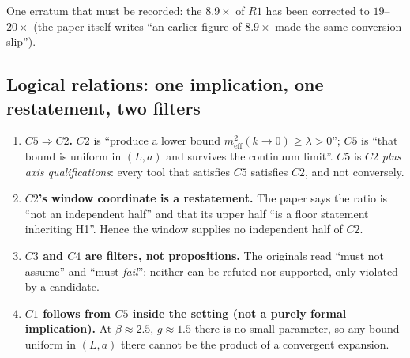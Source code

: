 
\noindent
One erratum that must be recorded: the $8.9\times$ of $R1$ has been corrected to $19$--$20\times$
(the paper itself writes ``an earlier figure of $8.9\times$ made the same conversion slip''). \LT
{}

\subsection{Logical relations: one implication, one restatement, two filters}

\begin{enumerate}[label=(\arabic*)]
\item \textbf{$C5\Rightarrow C2$.} $C2$ is ``produce a lower bound
      $m_{\mathrm{eff}}^{2}(k\to0)\ge\lambda>0$''; $C5$ is ``that bound is uniform in $(L,a)$ and
      survives the continuum limit''. $C5$ is $C2$ \emph{plus axis qualifications}: every tool that
      satisfies $C5$ satisfies $C2$, and not conversely. \LC
\item \textbf{$C2$'s window coordinate is a restatement.} The paper says the ratio is ``not an
      independent half'' and that its upper half ``is a floor statement inheriting H1''. Hence the
      window supplies no independent half of $C2$. \LT
\item \textbf{$C3$ and $C4$ are filters, not propositions.} The originals read ``must not assume''
      and ``must \emph{fail}'': neither can be refuted nor supported, only violated by a candidate. \LT
\item \textbf{$C1$ follows from $C5$ inside the setting (not a purely formal implication).} At
      $\beta\approx2.5$, $g\approx1.5$ there is no small parameter, so any bound uniform in $(L,a)$
      there cannot be the product of a convergent expansion. \LC
\end{enumerate}

